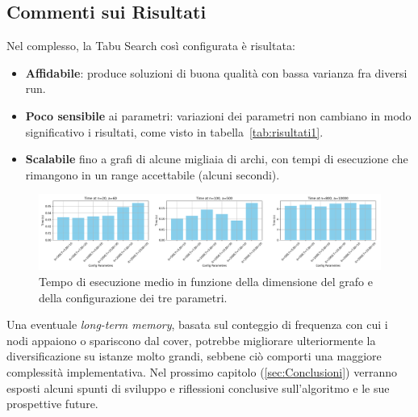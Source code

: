 \subsection{Commenti sui Risultati}

Nel complesso, la Tabu Search così configurata è risultata:
\begin{itemize}
    \item \textbf{Affidabile}: produce soluzioni di buona qualità con bassa varianza fra diversi run.
    \item \textbf{Poco sensibile} ai parametri: variazioni dei parametri non cambiano in modo significativo i risultati, come visto in tabella~\ref{tab:risultati1}.
    \item \textbf{Scalabile} fino a grafi di alcune migliaia di archi, con tempi di esecuzione che rimangono in un range accettabile (alcuni secondi).
\end{itemize}

\begin{figure}[h!]
\centering
\includegraphics[width=1\textwidth]{images/scalability_plot.png} %
\caption{Tempo di esecuzione medio in funzione della dimensione del grafo e della configurazione dei tre parametri.}
\label{fig:scalability}
\end{figure}

Una eventuale \emph{long-term memory}, basata sul conteggio di frequenza con cui i nodi appaiono o spariscono dal cover, potrebbe migliorare ulteriormente la diversificazione su istanze molto grandi, sebbene ciò comporti una maggiore complessità implementativa. Nel prossimo capitolo (\ref{sec:Conclusioni}) verranno esposti alcuni spunti di sviluppo e riflessioni conclusive sull'algoritmo e le sue prospettive future.

